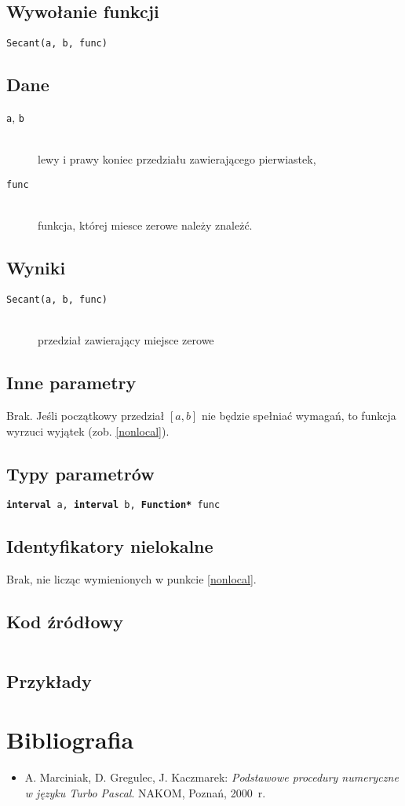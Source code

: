 \documentclass[12pt]{article}
\begin{document}
		\subsection{Wywołanie funkcji}
      \texttt{Secant(a, b, func)}

		\subsection{Dane}
      \begin{description}
        \item[\texttt{a}, \texttt{b}] \hfill\\ lewy i prawy koniec przedziału zawierającego pierwiastek,
        \item[\texttt{func}] \hfill\\ funkcja, której miesce zerowe należy znależć.
      \end{description}

		\subsection{Wyniki}
      \begin{description}
        \item[\texttt{Secant(a, b, func)}] \hfill\\
          przedział zawierający miejsce zerowe
      \end{description}

		\subsection{Inne parametry}
      Brak. Jeśli początkowy przedział $[a, b]$ nie będzie spełniać wymagań, to funkcja wyrzuci wyjątek (zob. \ref{nonlocal}).

		\subsection{Typy parametrów}
      \texttt{\textbf{interval} a, \textbf{interval} b, \textbf{Function*} func}

		\subsection{Identyfikatory nielokalne}
      Brak, nie licząc wymienionych w punkcie \ref{nonlocal}.

		\subsection{Kod źródłowy}
			\inputminted[firstline=6, lastline=40]{c++}{../solvers/secant.cpp}

		\subsection{Przykłady}

	\section{Bibliografia}
		\begin{itemize}
		  \item A. Marciniak, D. Gregulec, J. Kaczmarek: \textsl{Podstawowe procedury numeryczne w języku Turbo Pascal}. NAKOM, Poznań, 2000~r.
		\end{itemize}
\end{document}
